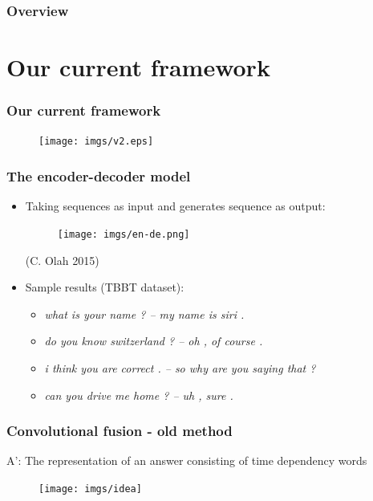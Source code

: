 \documentclass{beamer}
\begin{document}
\begin{frame}
\frametitle{Overview} 
\tableofcontents 
\end{frame}

\section{Our current framework} 

\begin{frame}
\frametitle{Our current framework}
\begin{figure}
\centering
\texttt{[image: imgs/v2.eps]}
\end{figure}
\end{frame}

\begin{frame}
\frametitle{The encoder-decoder model}
\begin{itemize}
\item Taking sequences as input and generates sequence as output:
\begin{figure}
\centering
\hspace{-1cm}\texttt{[image: imgs/en-de.png]}
\end{figure}
\hspace{9cm}\tiny{(C. Olah 2015)}
\end{itemize}
\begin{itemize}
\item Sample results (TBBT dataset):
\begin{itemize}
\item \emph{what is your name ? -- my name is siri .}
\item \emph{do you know switzerland ? -- oh , of course .}
\item \emph{i think you are correct . -- so why are you saying that ?}
\item \emph{can you drive me home ? -- uh , sure .}
\end{itemize}
\end{itemize}
\end{frame}
\begin{frame}
\frametitle{Convolutional fusion - old method}
A': The representation of an answer consisting of time dependency words

  \begin{figure}
      \centering
      \hspace{-1cm}\texttt{[image: imgs/idea]}
  \end{figure}
\end{frame}
\end{document}
